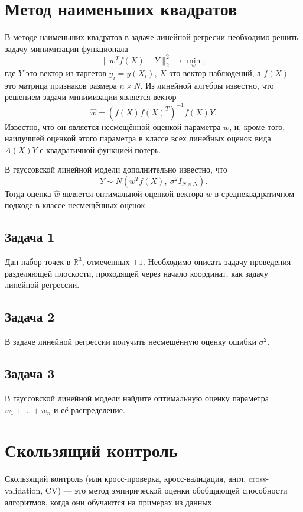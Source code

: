 \section{Метод наименьших квадратов}

В методе наименьших квадратов в задаче линейной регресии необходимо решить задачу минимизации функционала
\[
    \lVert{w^Tf(X) - Y}\rVert_2^2 \to \min_w,
\]
где $Y$ это вектор из таргетов $y_i = y(X_i)$, $X$ это вектор наблюдений, а $f(X)$ это матрица признаков размера $n \times N$.
Из линейной алгебры известно, что решением задачи минимизации является вектор
\[
    \hat{w} = (f(X)f(X)^T)^{-1}f(X)Y.
\]
Известно, что он является несмещённой оценкой параметра $w$, и, кроме того, наилучшей оценкой этого параметра в классе всех линейных оценок вида $A(X)Y$ с квадратичной функцией потерь.

В гауссовской линейной модели дополнительно известно, что
\[
    Y \sim N\left( w^Tf(X),\ \sigma^2 I_{N\times N} \right).
\]
Тогда оценка $\hat{w}$ является оптимальной оценкой вектора $w$ в среднеквадратичном подходе в классе несмещённых оценок.

\subsection*{Задача 1}

    Дан набор точек в $\mathbb{R}^3$, отмеченных $\pm1$.
    Необходимо описать задачу проведения разделяющей плоскости, проходящей через начало координат, как задачу линейной регрессии.

\subsection*{Задача 2}

    В задаче линейной регрессии получить несмещённую оценку ошибки $\sigma^2$.
    
\subsection*{Задача 3}

    В гауссовской линейной модели найдите оптимальную оценку параметра $w_1 + \ldots +w_n$ и её распределение.

\section{Скользящий контроль}

Скользящий контроль (или кросс-проверка, кросс-валидация, англ. cross-validation, CV) — это метод эмпирической оценки  обобщающей способности алгоритмов, когда они обучаются на примерах из данных.

